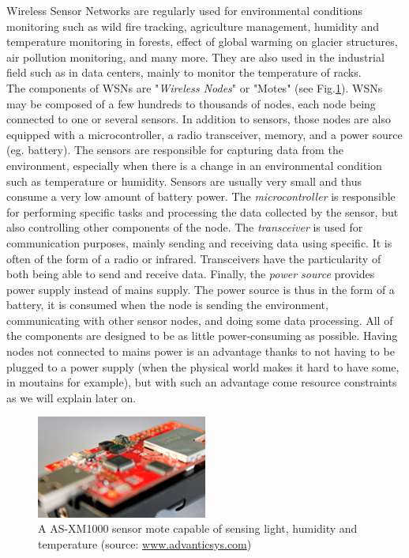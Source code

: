 Wireless Sensor Networks are regularly used for environmental conditions monitoring such as wild fire tracking, agriculture management, humidity and temperature monitoring in forests, effect of global warming on glacier structures, air pollution monitoring, and many more. They are also used in the industrial field such as in data centers, mainly to monitor the temperature of racks.  \\

The components of WSNs are "\textit{Wireless Nodes}" or "Motes" (see Fig.\ref{fig:xm1000}). WSNs may be composed of a few hundreds to thousands of nodes, each node being connected to one or several sensors. In addition to sensors, those nodes are also equipped with a microcontroller, a radio transceiver, memory, and a power source (eg. battery). The sensors are responsible for capturing data from the environment, especially when there is a change in an environmental condition such as temperature or humidity.  Sensors are usually very small and thus consume a very low amount of battery power. The \textit{microcontroller} is responsible for performing specific tasks and processing the data collected by the sensor, but also controlling other components of the node. The \textit{transceiver} is used for communication purposes, mainly sending and receiving data using specific. It is often of the form of a radio or infrared. Transceivers have the particularity of both being able to send and receive data. Finally, the \textit{power source} provides power supply instead of mains supply. The power source is thus in the form of a battery, it is consumed when the node is sending the environment, communicating with other sensor nodes, and doing some data processing. All of the components are designed to be as little power-consuming as possible. Having nodes not connected to mains power is an advantage thanks to not having to be plugged to a power supply (when the physical world makes it hard to have some, in moutains for example), but with such an advantage come resource constraints as we will explain later on.\\

\begin{figure}
  \centering
  \includegraphics[width=0.5\textwidth]{res/xm1000.png}
  \caption{A AS-XM1000 sensor mote capable of sensing light, humidity and temperature (source: \url{www.advanticsys.com})}
  \label{fig:xm1000}
\end{figure}

